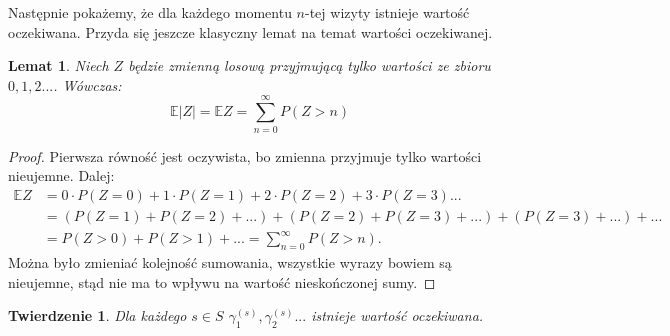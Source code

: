 \documentclass[a4paper]{article}
\theoremstyle{defn}
\theoremstyle{theorem}
\newtheorem{theorem}[defn]{Twierdzenie}
\theoremstyle{lemma}
\newtheorem{lemma}[defn]{Lemat}
\theoremstyle{cor}
\theoremstyle{fact}
\begin{document}
Następnie pokażemy, że dla każdego momentu $n$-tej wizyty istnieje wartość oczekiwana. Przyda się jeszcze klasyczny lemat na temat wartości oczekiwanej.
\begin{lemma}\label{lemma2.5.4}
Niech $Z$ będzie zmienną losową przyjmującą tylko wartości ze zbioru $0,1,2...$. Wówczas:
$$\mathbb{E}|Z| = \mathbb{E}Z = \sum\limits_{n = 0}^{\infty} P(Z > n)$$
\end{lemma}
\begin{proof}
Pierwsza równość jest oczywista, bo zmienna przyjmuje tylko wartości nieujemne. Dalej:
\begin{align*}
    \mathbb{E}Z &= 0 \cdot P(Z = 0) + 1 \cdot P(Z = 1) + 2 \cdot P(Z = 2) + 3 \cdot P(Z = 3)... \\
    &= (P(Z = 1) + P(Z = 2) + ...) + (P(Z = 2) + P(Z = 3) + ...) + (P(Z = 3) + ...) + ...\\
    &= P(Z > 0) + P(Z > 1) + ... = \sum\limits_{n = 0}^{\infty} P(Z > n).
\end{align*}
Można było zmieniać kolejność sumowania, wszystkie wyrazy bowiem są nieujemne, stąd nie ma to wpływu na wartość nieskończonej sumy.
\end{proof}
\begin{theorem}\label{theorem2.5.5}
Dla każdego $s\in S$ $\gamma_1^{(s)}, \gamma_2^{(s)}...$ istnieje wartość oczekiwana.
\end{theorem}
\end{document}
